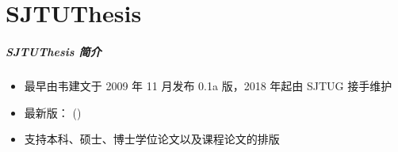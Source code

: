 
\part{SJTUThesis}

\begin{frame}
    \frametitle{SJTUThesis 简介}
    \begin{itemize}
        \item 最早由韦建文于 2009 年 11 月发布 0.1a 版，2018 年起由 SJTUG 接手维护
        \item 最新版：\SJTUThesisVersion{} (\SJTUThesisDate)
        \item 支持本科、硕士、博士学位论文以及课程论文的排版
    \end{itemize}
\end{frame}